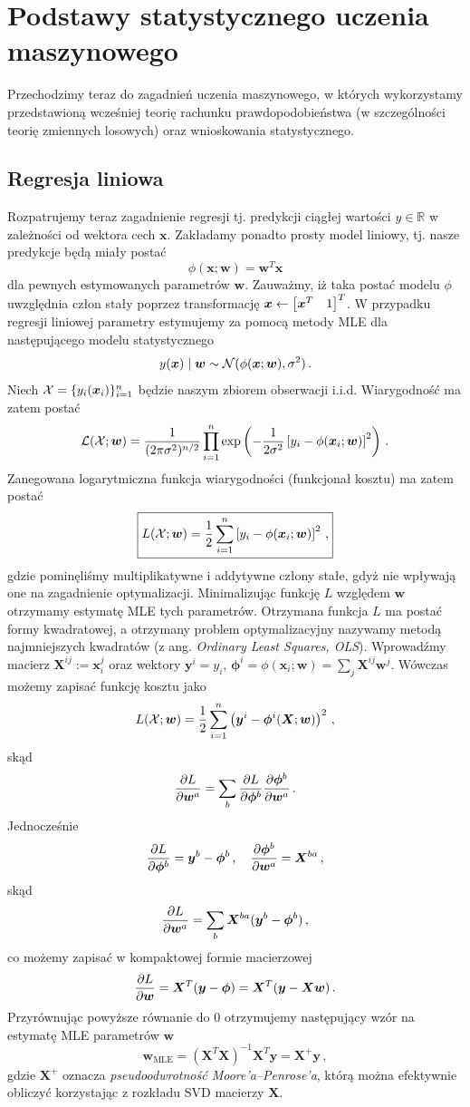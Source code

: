 \documentclass{myclass}
\numberwithin{equation}{subsection}
\begin{document}
\section{Podstawy statystycznego uczenia maszynowego}

Przechodzimy teraz do zagadnień uczenia maszynowego, w których wykorzystamy przedstawioną wcześniej
teorię rachunku prawdopodobieństwa (w szczególności teorię zmiennych losowych) oraz wnioskowania
statystycznego.


\subsection{Regresja liniowa}

Rozpatrujemy teraz zagadnienie regresji tj. predykcji ciągłej wartości \(y \in \mathbb{R}\) w
zależności od wektora cech \(\bm{x}\). Zakładamy ponadto prosty model liniowy, tj. nasze predykcje
będą miały postać
\[
\phi(\bm{x}; \bm{w}) = \bm{w}^T \bm{x}
\]
dla pewnych estymowanych parametrów \(\bm{w}\). Zauważmy, iż taka postać modelu \(\phi\) uwzględnia
człon stały poprzez transformację \(\bm{x} \leftarrow \mqty[\bm{x}^T & 1]^T\). W przypadku regresji
liniowej parametry estymujemy za pomocą metody MLE dla następującego modelu statystycznego
\[
y(\bm{x}) \mid \bm{w} \sim \mathcal{N}(\phi(\bm{x}; \bm{w}), \sigma^2)\,.
\]
Niech \(\mathcal{X} = \{y_i(\bm{x}_i)\}_{i=1}^n\) będzie naszym zbiorem obserwacji i.i.d. Wiarygodność ma
zatem postać
\[
\mathcal{L}(\mathcal{X} ; \bm{w}) = \frac{1}{(2\pi\sigma^2)^{n/2}} \prod_{i=1}^n \exp\left(-\frac{1}{2\sigma^2}\left[y_i - \phi(\bm{x}_i; \bm{w})\right]^2\right)\,.
\]
Zanegowana logarytmiczna funkcja wiarygodności (funkcjonał kosztu) ma zatem postać
\[
\boxed{
L(\mathcal{X}; \bm{w}) = \frac{1}{2}\sum_{i=1}^n \left[y_i - \phi(\bm{x}_i; \bm{w})\right]^2\,, 
}
\]
gdzie pominęliśmy multiplikatywne i addytywne człony stałe, gdyż nie wpływają one na zagadnienie
optymalizacji. Minimalizując funkcję \(L\) względem \(\bm{w}\) otrzymamy estymatę MLE tych
parametrów. Otrzymana funkcja \(L\) ma postać formy kwadratowej, a otrzymany problem optymalizacyjny
nazywamy metodą najmniejszych kwadratów (z ang. \textit{Ordinary Least Squares, OLS}). Wprowadźmy
macierz \(\bm{X}^{ij} := \bm{x}_i^j\) oraz wektory \(\bm{y}^i = y_i\), \(\bm{\phi}^i =
\phi(\bm{x}_i; \bm{w}) = \sum_j \bm{X}^{ij} \bm{w}^j\). Wówczas możemy zapisać funkcję kosztu jako
\[
L(\mathcal{X}; \bm{w}) = \frac{1}{2}\sum_{i=1}^n \left(\bm{y}^i - \bm{\phi}^i(\bm{X}; \bm{w})\right)^2\,,
\]
skąd
\[
\pdv{L}{\bm{w}^a} = \sum_b \pdv{L}{\bm{\phi}^b} \pdv{\bm{\phi}^b}{\bm{w}^a}\,.
\]
Jednocześnie
\[
\pdv{L}{\bm{\phi}^b} = \bm{y}^b - \bm{\phi}^b\,,\quad \pdv{\bm{\phi}^b}{\bm{w}^a} = \bm{X}^{ba}\,,
\]
skąd
\[
\pdv{L}{\bm{w}^a} = \sum_b \bm{X}^{ba}(\bm{y}^b - \bm{\phi}^b)\,,
\]
co możemy zapisać w kompaktowej formie macierzowej
\[
\pdv{L}{\bm{w}} = \bm{X}^T(\bm{y} - \bm{\phi}) = \bm{X}^T(\bm{y} - \bm{X}\bm{w})\,.
\]
Przyrównując powyższe równanie do 0 otrzymujemy następujący wzór na estymatę MLE parametrów
\(\bm{w}\)
\[
\boxed{
\bm{w}_\text{MLE} = \left(\bm{X}^T\bm{X}\right)^{-1}\bm{X}^T\bm{y} = \bm{X}^+\bm{y}\,,
}
\]
gdzie \(\bm{X}^+\) oznacza \emph{pseudoodwrotność Moore'a--Penrose'a}, którą można efektywnie
obliczyć korzystając z rozkładu SVD macierzy \(\bm{X}\).
\end{document}
